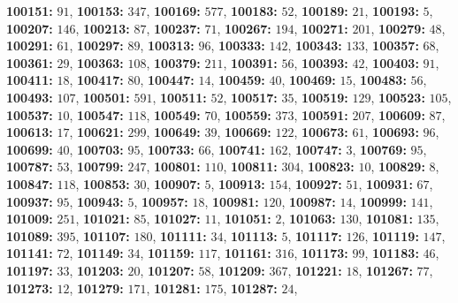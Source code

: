 \textsf{\bfseries 100151:} $91$, \textsf{\bfseries 100153:} $347$, \textsf{\bfseries 100169:} $577$, \textsf{\bfseries 100183:} $52$, \textsf{\bfseries 100189:} $21$, \textsf{\bfseries 100193:} $5$, \textsf{\bfseries 100207:} $146$, \textsf{\bfseries 100213:} $87$, \textsf{\bfseries 100237:} $71$, \textsf{\bfseries 100267:} $194$, \textsf{\bfseries 100271:} $201$, \textsf{\bfseries 100279:} $48$, \textsf{\bfseries 100291:} $61$, \textsf{\bfseries 100297:} $89$, \textsf{\bfseries 100313:} $96$, \textsf{\bfseries 100333:} $142$, \textsf{\bfseries 100343:} $133$, \textsf{\bfseries 100357:} $68$, \textsf{\bfseries 100361:} $29$, \textsf{\bfseries 100363:} $108$, \textsf{\bfseries 100379:} $211$, \textsf{\bfseries 100391:} $56$, \textsf{\bfseries 100393:} $42$, \textsf{\bfseries 100403:} $91$, \textsf{\bfseries 100411:} $18$, \textsf{\bfseries 100417:} $80$, \textsf{\bfseries 100447:} $14$, \textsf{\bfseries 100459:} $40$, \textsf{\bfseries 100469:} $15$, \textsf{\bfseries 100483:} $56$, \textsf{\bfseries 100493:} $107$, \textsf{\bfseries 100501:} $591$, \textsf{\bfseries 100511:} $52$, \textsf{\bfseries 100517:} $35$, \textsf{\bfseries 100519:} $129$, \textsf{\bfseries 100523:} $105$, \textsf{\bfseries 100537:} $10$, \textsf{\bfseries 100547:} $118$, \textsf{\bfseries 100549:} $70$, \textsf{\bfseries 100559:} $373$, \textsf{\bfseries 100591:} $207$, \textsf{\bfseries 100609:} $87$, \textsf{\bfseries 100613:} $17$, \textsf{\bfseries 100621:} $299$, \textsf{\bfseries 100649:} $39$, \textsf{\bfseries 100669:} $122$, \textsf{\bfseries 100673:} $61$, \textsf{\bfseries 100693:} $96$, \textsf{\bfseries 100699:} $40$, \textsf{\bfseries 100703:} $95$, \textsf{\bfseries 100733:} $66$, \textsf{\bfseries 100741:} $162$, \textsf{\bfseries 100747:} $3$, \textsf{\bfseries 100769:} $95$, \textsf{\bfseries 100787:} $53$, \textsf{\bfseries 100799:} $247$, \textsf{\bfseries 100801:} $110$, \textsf{\bfseries 100811:} $304$, \textsf{\bfseries 100823:} $10$, \textsf{\bfseries 100829:} $8$, \textsf{\bfseries 100847:} $118$, \textsf{\bfseries 100853:} $30$, \textsf{\bfseries 100907:} $5$, \textsf{\bfseries 100913:} $154$, \textsf{\bfseries 100927:} $51$, \textsf{\bfseries 100931:} $67$, \textsf{\bfseries 100937:} $95$, \textsf{\bfseries 100943:} $5$, \textsf{\bfseries 100957:} $18$, \textsf{\bfseries 100981:} $120$, \textsf{\bfseries 100987:} $14$, \textsf{\bfseries 100999:} $141$, \textsf{\bfseries 101009:} $251$, \textsf{\bfseries 101021:} $85$, \textsf{\bfseries 101027:} $11$, \textsf{\bfseries 101051:} $2$, \textsf{\bfseries 101063:} $130$, \textsf{\bfseries 101081:} $135$, \textsf{\bfseries 101089:} $395$, \textsf{\bfseries 101107:} $180$, \textsf{\bfseries 101111:} $34$, \textsf{\bfseries 101113:} $5$, \textsf{\bfseries 101117:} $126$, \textsf{\bfseries 101119:} $147$, \textsf{\bfseries 101141:} $72$, \textsf{\bfseries 101149:} $34$, \textsf{\bfseries 101159:} $117$, \textsf{\bfseries 101161:} $316$, \textsf{\bfseries 101173:} $99$, \textsf{\bfseries 101183:} $46$, \textsf{\bfseries 101197:} $33$, \textsf{\bfseries 101203:} $20$, \textsf{\bfseries 101207:} $58$, \textsf{\bfseries 101209:} $367$, \textsf{\bfseries 101221:} $18$, \textsf{\bfseries 101267:} $77$, \textsf{\bfseries 101273:} $12$, \textsf{\bfseries 101279:} $171$, \textsf{\bfseries 101281:} $175$, \textsf{\bfseries 101287:} $24$, 
